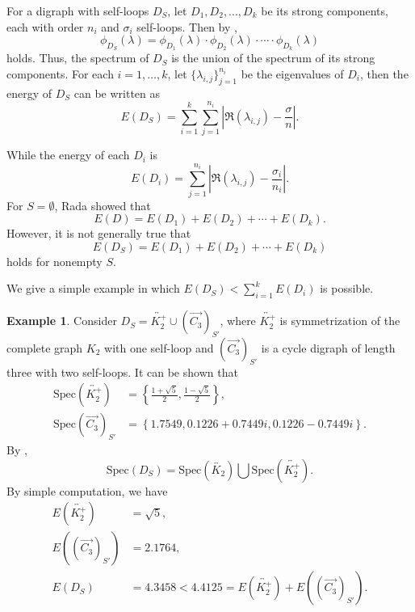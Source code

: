 \documentclass[12pt,a4paper,reqno]{amsart}
\numberwithin{equation}{section}
\theoremstyle{plain}
\theoremstyle{definition}
\newtheorem{example}[theorem]{Example}
\newcommand{\<}{\langle}
\renewcommand{\>}{\rangle}
\begin{document}
	For a digraph with self-loops $D_S$, let $D_1, D_2,..., D_k$ be its strong components, each with order $n_i$ and $\sigma_i$ self-loops. Then by \cite[Theorem 2.4]{cvetkovic1995spectra},
	\[
	\phi_{D_S}(\lambda)=\phi_{D_1}(\lambda)\cdot \phi_{D_2}(\lambda) \cdot \cdots \cdot \phi_{D_k}(\lambda)
	\]
	holds. Thus, the spectrum of $D_S$ is the union of the spectrum of its strong components. For each $i=1,\ldots, k$, let $\{\lambda_{i,j} \}_{j=1}^{n_i}$ be the eigenvalues of $D_i$, then the energy of $D_S$ can be written as 
    \begin{equation}\label{energy_eq}
        E(D_S)= \sum_{i=1}^k \sum_{j=1}^{n_i} \left| \Re(\lambda_{i,j})-\frac{\sigma}{n} \right|.    
    \end{equation}
	
	While the energy of each $D_i$ is 
    \begin{equation}\label{sum_energy_components_eq}
        E(D_i)= \sum_{j=1}^{n_i} \left| \Re(\lambda_{i,j})-\frac{\sigma_i}{n_i} \right|.
    \end{equation}
    For $S=\emptyset$, Rada \cite{rada2009mcclelland} showed that 
    $$E(D)=E(D_1)+ E(D_2)+ \cdots + E(D_k).$$
    However, it is not generally true that 
	$$E(D_S)=E(D_1)+ E(D_2)+ \cdots + E(D_k)$$
    holds for nonempty $S$.
    
    We give a simple example in which $E(D_S)<\sum_{i=1}^{k} E(D_i)$ is possible.
    \begin{example}
    Consider $D_S=\overleftrightarrow{K_2^+} \cup (\overrightarrow{C_3})_{S'}$, where $\overleftrightarrow{K_2^+}$ is symmetrization of the complete graph $K_2$ with one self-loop and $(\overrightarrow{C_3})_{S'}$ is a cycle digraph of length three with two self-loops. It can be shown that 
    \begin{align*}
        \mathrm{Spec}(\overleftrightarrow{K_2^+}) &= \left\{\frac{1+\sqrt{5}}{2}, \frac{1-\sqrt{5}}{2} \right\}, \\
        \mathrm{Spec}(\overrightarrow{C_3})_{S'} &= \left\{ 1.7549, 0.1226+0.7449i,  0.1226-0.7449i    \right\}.
    \end{align*}
    By \cite[Theorem 2.4]{cvetkovic1995spectra}, 
    $$\mathrm{Spec}(D_S) =  \mathrm{Spec}(\overleftrightarrow{K_2}) \bigcup \mathrm{Spec}(\overleftrightarrow{K_2^+}).$$
    By simple computation, we have 
    \begin{align*}
        E\left(\overleftrightarrow{K_2^+}\right) &=\sqrt{5},\\
        E\left((\overrightarrow{C_3})_{S'}\right) &= 2.1764,\\
        E(D_S) &= 4.3458 < 4.4125=E\left(\overleftrightarrow{K_2^+}\right)+E\left((\overrightarrow{C_3})_{S'}\right). 
    \end{align*}
    \end{example}
\end{document}
